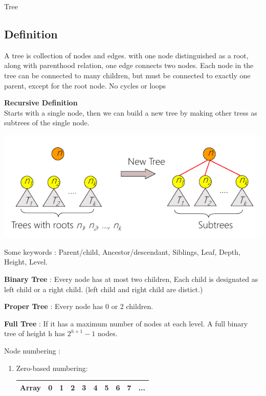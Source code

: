 \begin{section}
    {Tree}

\subsection*{Definition}
A tree is collection of nodes and edges. with one node distinguished as a root, along with parenthood relation, one edge connects two nodes.
Each node in the tree can be connected to many children, but must be connected to exactly one parent, except for the root node.
No cycles or loops

\bigskip\textbf{Recursive Definition} \\
Starts with a single node, then we can build a new tree by making other tress as subtrees of the single node.
\begin{center}
    \includegraphics[]{img/treerecursivedef.png}
\end{center}

Some keywords : Parent/child, Ancestor/descendant, Siblings, Leaf, Depth, Height, Level.

\bigskip\noindent
\textbf{Binary Tree} : Every node has at most two children, Each child is designated as left child or a right child. (left child and right child are distict.)

\noindent
\textbf{Proper Tree} : Every node has 0 or 2 children.

\noindent
\textbf{Full Tree} : If it has a maximum number of nodes at each level. A full binary tree of height h has $2^{h+1} - 1$ nodes.
\bigskip

Node numbering :
\begin{enumerate}
    \item Zero-based numbering: \\
    \begin{tabular}{|c|c|c|c|c|c|c|c|c|c|}
        \hline
        \textbf{Array} & 0 & 1 & 2 & 3 & 4 & 5 & 6 & 7 & ... \\
        \hline
    \end{tabular}
    

\end{enumerate}
\end{section}
